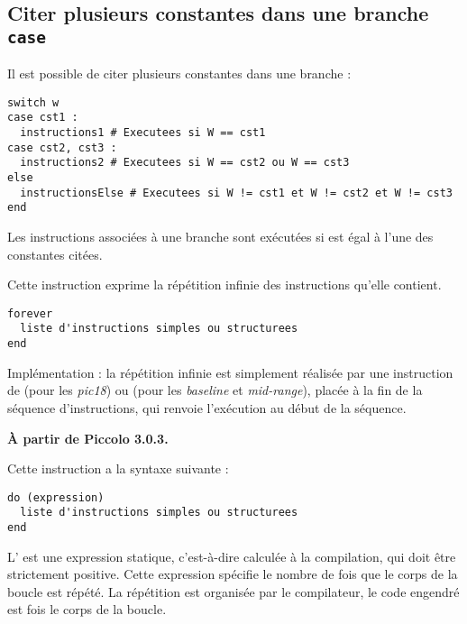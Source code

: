 \subsection{Citer plusieurs constantes dans une branche \texttt{case}}

Il est possible de citer plusieurs constantes dans une branche  :
\begin{lstlisting}[language=piccolo]
switch w
case cst1 :
  instructions1 # Executees si W == cst1
case cst2, cst3 :
  instructions2 # Executees si W == cst2 ou W == cst3
else
  instructionsElse # Executees si W != cst1 et W != cst2 et W != cst3
end
\end{lstlisting}

Les instructions associées à une branche  sont exécutées si  est égal à l'une des constantes citées.







Cette instruction exprime la répétition infinie des instructions qu'elle contient.
\begin{lstlisting}[language=piccolo]
forever
  liste d'instructions simples ou structurees
end
\end{lstlisting}

Implémentation : la répétition infinie est simplement réalisée par une instruction de  (pour les \emph{pic18}) ou  (pour les \emph{baseline} et \emph{mid-range}), placée à la fin de la séquence d'instructions, qui renvoie l'exécution au début de la séquence.






\textbf{À partir de Piccolo 3.0.3.}


Cette instruction a la syntaxe suivante :
\begin{lstlisting}[language=piccolo]
do (expression)
  liste d'instructions simples ou structurees
end
\end{lstlisting}

L' est une expression statique, c'est-à-dire calculée à la compilation, qui doit être strictement positive. Cette expression spécifie le nombre de fois que le corps de la boucle est répété. La répétition est organisée par le compilateur, le code engendré est  fois le corps de la boucle.

